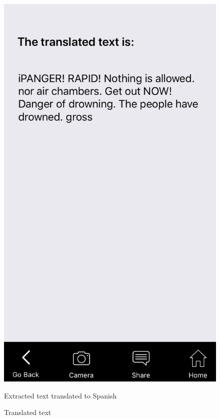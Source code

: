 \documentclass[12pt]{article}
\begin{document}
 \begin{figure} [H]
\centering
\begin{minipage}{.5\textwidth}
  \centering
  \includegraphics[width=0.9\linewidth]{media/3.PNG}
  \caption{Translated text}{Extracted text translated to Spanish}
  \label{fig:translated}
\end{minipage}%
\begin{minipage}{.5\textwidth}
  \centering

\end{minipage}
\end{figure}
\end{document}
